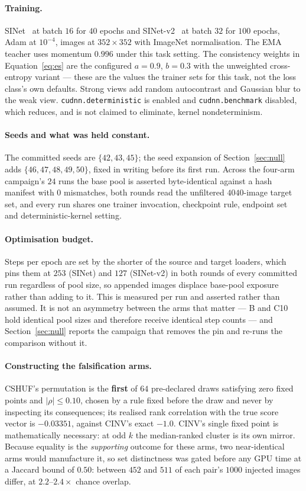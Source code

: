 \documentclass{article} %
\begin{document}
\paragraph{Training.} SINet~\citep{fan2020sinet} at batch $16$ for $40$ epochs and
SINet-v2~\citep{fan2022concealed} at batch $32$ for $100$ epochs, Adam at $10^{-4}$, images at
$352 \times 352$ with ImageNet normalisation. The EMA teacher uses momentum $0.996$ under this task
setting. The consistency weights in Equation~\ref{eq:es} are the configured $a = 0.9$, $b = 0.3$
with the unweighted cross-entropy variant --- these are the values the trainer sets for this task,
not the loss class's own defaults. Strong views add random autocontrast and Gaussian blur to the
weak view. \texttt{cudnn.deterministic} is enabled and \texttt{cudnn.benchmark} disabled, which
reduces, and is not claimed to eliminate, kernel nondeterminism.

\paragraph{Seeds and what was held constant.} The committed seeds are $\{42, 43, 45\}$; the seed
expansion of Section~\ref{sec:null} adds $\{46, 47, 48, 49, 50\}$, fixed in writing before its first
run. Across the four-arm campaign's $24$ runs the base pool is asserted byte-identical against a
hash manifest with $0$ mismatches, both rounds read the unfiltered $4040$-image target set, and
every run shares one trainer invocation, checkpoint rule, endpoint set and deterministic-kernel
setting.

\paragraph{Optimisation budget.} Steps per epoch are set by the shorter of the source and target
loaders, which pins them at $253$ (SINet) and $127$ (SINet-v2) in both rounds of every committed run
regardless of pool size, so appended images displace base-pool exposure rather than adding to it.
This is measured per run and asserted rather than assumed. It is not an asymmetry between the arms
that matter --- B and C10 hold identical pool sizes and therefore receive identical step counts ---
and Section~\ref{sec:null} reports the campaign that removes the pin and re-runs the comparison
without it.

\paragraph{Constructing the falsification arms.} CSHUF's permutation is the \textbf{first} of $64$
pre-declared draws satisfying zero fixed points and $|\rho| \leq 0.10$, chosen by a rule fixed
before the draw and never by inspecting its consequences; its realised rank correlation with the
true score vector is $-0.03351$, against CINV's exact $-1.0$. CINV's single fixed point is
mathematically necessary: at odd $k$ the median-ranked cluster is its own mirror. Because equality
is the \emph{supporting} outcome for these arms, two near-identical arms would manufacture it, so
set distinctness was gated before any GPU time at a Jaccard bound of $0.50$: between $452$ and $511$
of each pair's $1000$ injected images differ, at $2.2$--$2.4\times$ chance overlap.
\end{document}
